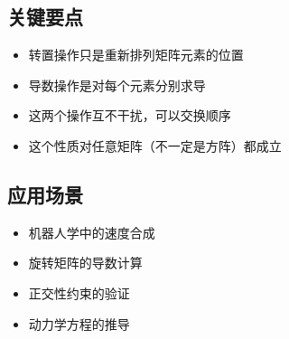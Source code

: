 \documentclass[12pt,a4paper]{article}
\begin{document}
\subsection{关键要点}

\begin{itemize}
\item 转置操作只是重新排列矩阵元素的位置
\item 导数操作是对每个元素分别求导
\item 这两个操作互不干扰，可以交换顺序
\item 这个性质对任意矩阵（不一定是方阵）都成立
\end{itemize}

\subsection{应用场景}

\begin{itemize}
\item 机器人学中的速度合成
\item 旋转矩阵的导数计算
\item 正交性约束的验证
\item 动力学方程的推导
\end{itemize}
\end{document}
